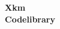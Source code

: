 \documentclass[9pt,landscape]{article}
\begin{document}
\thispagestyle{empty}
\null\vfill
\begin{center}
  \Huge \textbf{Xkm \\ Codelibrary}

  \vspace{1.5cm}

\end{center}
\vfill
\clearpage

\begin{multicols}{2}
  \tableofcontents
\end{multicols}

\newpage

\columnseprule=0.25pt

\begin{multicols}{2}
  
\end{multicols}
\end{document}

